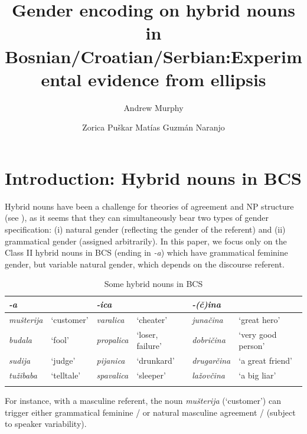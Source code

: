 \documentclass[output=paper,
modfonts,
newtxmath,
hidelinks
]{langscibook}
\title{Gender encoding on hybrid nouns in Bosnian\slash Croatian\slash Serbian:\newlineCover Experimental evidence from ellipsis}
\author{%
 Andrew Murphy\affiliation{University of Leipzig}\and 
 Zorica Puškar\affiliation{Leibniz-Zentrum Allgemeine Sprachwissenschaft, Berlin}\lastand 
 Matías Guzmán Naranjo\affiliation{Heinrich Heine University Düsseldorf}
}
\begin{document}
\maketitle
{}

\section{Introduction: Hybrid nouns in BCS}

Hybrid nouns have been a challenge for theories of agreement and NP structure (see \citealt{corbett91,wandz03,aandalfg,aandalanguage,pesetsky14,kramerbook,Landau2016DPinternalsemantic,smith15,smith16,arsenijevicjuksek,despichybrid17}), as it seems that they can simultaneously bear two types of gender specification: 
(i) natural gender (reflecting the gender of the referent) and
(ii) grammatical gender (assigned arbitrarily). In this paper, we focus only on the Class II hybrid nouns in BCS (ending in \textit{-a}) which have grammatical feminine gender, but variable natural gender, which depends on the discourse referent.
	

\begin{table}
\caption{Some hybrid nouns in BCS}\label{14:t1}
\small
\begin{tabularx}{\textwidth}{llllll}
\lsptoprule
\textbf{\textit{-a}}&&\textbf{\textit{-ica}}&&\textbf{\textit{-(č)ina}}&\\
\midrule
\textit{mušterija} & `customer' &  \textit{varalica} & `cheater'  & \textit{junačina} & `great hero'\\  
\textit{budala} & `fool'  & \textit{propalica} & `loser, failure' & \textit{dobričina} & `very good person'\\
\textit{sudija} & `judge' & \textit{pijanica} & `drunkard'  & \textit{drugarčina} & `a great friend'\\
\textit{tužibaba} & `telltale' & \textit{spavalica} & `sleeper' & \textit{lažovčina} & `a big liar' \\
\lspbottomrule
\end{tabularx}
\end{table}

\noindent For instance, with a masculine referent, the noun \textit{mušterija} (`customer') can trigger either grammatical feminine  / or natural masculine agreement  / (subject to speaker variability).
	
\end{document}
